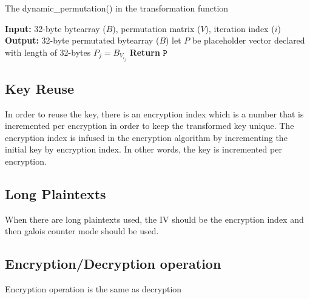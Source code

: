 \documentclass[fleqn, a4paper,12pt]{article}
\begin{document}
\begin{algorithm}[H] %
\caption{The dynamic\_permutation() in the transformation function}
\begin{algorithmic}[1]  %
\State \textbf{Input:} 32-byte bytearray ($B$), permutation matrix ($V$), iteration index ($i$)
\State \textbf{Output:} 32-byte permutated bytearray ($B$)
\State let $P$ be placeholder vector declared with length of 32-bytes
		\State $P_j = B_{V_{i_j}}$
\EndFor
\State \textbf{Return} $\texttt{P}$
\end{algorithmic}
\end{algorithm}

\subsection {Key Reuse}

In order to reuse the key, there is an encryption index which is a number that is incremented per encryption in order to keep the transformed key unique. The encryption index is infused in the encryption algorithm by incrementing the initial key by encryption index. In other words, the key is incremented per encryption.

\subsection {Long Plaintexts}

When there are long plaintexts used, the IV should be the encryption index and then galois counter mode should be used.

\subsection {Encryption/Decryption operation}

Encryption operation is the same as decryption
\end{document}
